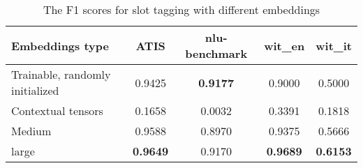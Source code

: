 
\begin{table}
  \begin{tabularx}{\textwidth}{Lcccc}
    \toprule
    \textbf{Embeddings type} & \textbf{ATIS} & \textbf{nlu-benchmark} & \textbf{wit\_en} & \textbf{wit\_it} \\
    \midrule
    Trainable, randomly initialized & 0.9425 & \textbf{0.9177} & 0.9000 & 0.5000 \\
    \midrule
    Contextual tensors & 0.1658 & 0.0032 & 0.3391 & 0.1818 \\
    \midrule
    Medium & 0.9588 & 0.8970 & 0.9375 & 0.5666 \\
    \midrule
    large & \textbf{0.9649} & 0.9170 & \textbf{0.9689} & \textbf{0.6153} \\
    \bottomrule
  \end{tabularx}
  \caption{The F1 scores for slot tagging with different embeddings}\label{tab:slotsEmbeddingsChoice}
\end{table}